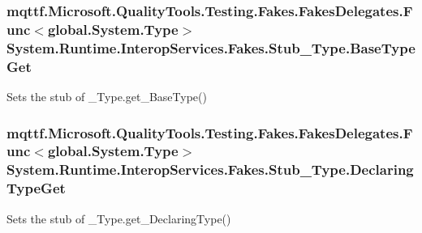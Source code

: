 \hypertarget{class_system_1_1_runtime_1_1_interop_services_1_1_fakes_1_1_stub___type_ac3856b6cdb7298e7097b9dfa9193e158}{
\subsubsection[{Base\-Type\-Get}]{\setlength{\rightskip}{0pt plus 5cm}mqttf.\-Microsoft.\-Quality\-Tools.\-Testing.\-Fakes.\-Fakes\-Delegates.\-Func$<$global.\-System.\-Type$>$ System.\-Runtime.\-Interop\-Services.\-Fakes.\-Stub\-\_\-\-Type.\-Base\-Type\-Get}}\label{class_system_1_1_runtime_1_1_interop_services_1_1_fakes_1_1_stub___type_ac3856b6cdb7298e7097b9dfa9193e158}


Sets the stub of \-\_\-\-Type.\-get\-\_\-\-Base\-Type()

\hypertarget{class_system_1_1_runtime_1_1_interop_services_1_1_fakes_1_1_stub___type_af166526cf34260a419c70c1eedcee38d}{
\subsubsection[{Declaring\-Type\-Get}]{\setlength{\rightskip}{0pt plus 5cm}mqttf.\-Microsoft.\-Quality\-Tools.\-Testing.\-Fakes.\-Fakes\-Delegates.\-Func$<$global.\-System.\-Type$>$ System.\-Runtime.\-Interop\-Services.\-Fakes.\-Stub\-\_\-\-Type.\-Declaring\-Type\-Get}}\label{class_system_1_1_runtime_1_1_interop_services_1_1_fakes_1_1_stub___type_af166526cf34260a419c70c1eedcee38d}


Sets the stub of \-\_\-\-Type.\-get\-\_\-\-Declaring\-Type()

